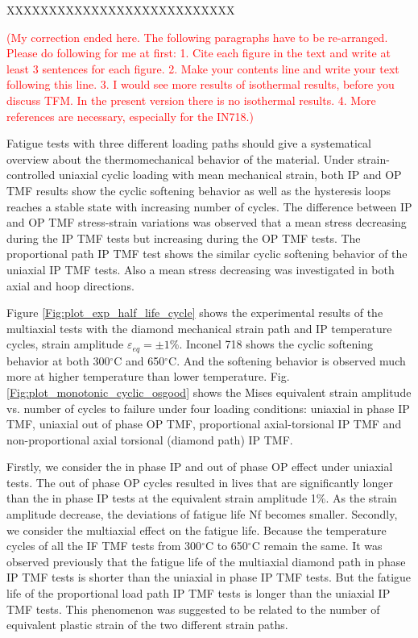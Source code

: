 \documentclass[preprint,5p,twocolumn,11pt,sort&compress]{elsarticle}
\newcommand{\marked}[1]{\textcolor{red}{#1}}
\begin{document}
XXXXXXXXXXXXXXXXXXXXXXXXXXX

\marked{(My correction ended here. The following paragraphs have to be re-arranged. Please do following for me at first:
1. Cite each figure in the text and write at least 3 sentences for each figure. 2. Make your contents line and write your text following this line. 3. I would see more results of isothermal results, before you discuss TFM. In the present version there is no isothermal results. 4. More references are necessary, especially for the IN718.)}


Fatigue tests with three different loading paths should give a systematical overview about the thermomechanical behavior of the material. Under strain-controlled uniaxial cyclic loading with mean mechanical strain, both IP and OP TMF results show the cyclic softening behavior as well as the hysteresis loops reaches a stable state with increasing number of cycles. The difference between IP and OP TMF stress-strain variations was observed that a mean stress decreasing during the IP TMF tests but increasing during the OP TMF tests. The proportional path IP TMF test shows the similar cyclic softening behavior of the uniaxial IP TMF tests. Also a mean stress decreasing was investigated in both axial and hoop directions.

Figure \ref{Fig:plot_exp_half_life_cycle} shows the experimental results of the multiaxial tests with the diamond mechanical strain path and IP temperature cycles, strain amplitude $\varepsilon_{eq} = \pm1$\%. Inconel 718 shows the cyclic softening behavior at both 300$^\circ$C and 650$^\circ$C. And the softening behavior is observed much more at higher temperature than lower temperature.
Fig. \ref{Fig:plot_monotonic_cyclic_osgood} shows the Mises equivalent strain amplitude vs. number of cycles to failure under four loading conditions: uniaxial in phase IP TMF, uniaxial out of phase OP TMF, proportional axial-torsional IP TMF and non-proportional axial torsional (diamond path) IP TMF.

Firstly, we consider the in phase IP and out of phase OP effect under uniaxial tests. The out of phase OP cycles resulted in lives that are significantly longer than the in phase IP tests at the equivalent strain amplitude 1\%. As the strain amplitude decrease, the deviations of fatigue life Nf  becomes smaller.
Secondly, we consider the multiaxial effect on the fatigue life. Because the temperature cycles of all the IF TMF tests from 300$^\circ$C to 650$^\circ$C remain the same. It was observed previously that the fatigue life of the multiaxial diamond path in phase IP TMF tests is shorter than the uniaxial in phase IP TMF tests. But the fatigue life of the proportional load path IP TMF tests is longer than the uniaxial IP TMF tests. This phenomenon was suggested to be related to the number of equivalent plastic strain of the two different strain paths.
\end{document}
